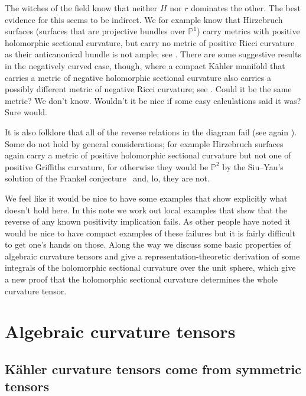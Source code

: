 \documentclass[10pt,a4paper]{amsart}
\theoremstyle{definition}
\newcommand{\kk}[1]{\mathbb{#1}}
\begin{document}
The witches of the field know that neither $H$ nor $r$ dominates the other.
The best evidence for this seems to be indirect.
We for example know that Hirzebruch surfaces (surfaces that are projective
bundles over $\kk P^1$) carry metrics with positive holomorphic sectional
curvature, but carry no metric of positive Ricci curvature as their anticanonical
bundle is not ample;
see \cite{hitchin1975curvature,alvarez2018projectivized,yang2019hirzebruch}.
There are some suggestive results in the negatively curved case, though,
where a compact K\"ahler manifold that carries a metric of negative holomorphic
sectional curvature also carries a possibly different metric of negative Ricci
curvature; see \cite{wu2016negative,tosatti2017extension,diverio2019quasi}.
Could it be the same metric?
We don't know.
Wouldn't it be nice if some easy calculations said it was?
Sure would.

It is also folklore that all of the reverse relations in the diagram fail (see
again \cite{zheng2000complex}). Some do not hold by general considerations; for
example Hirzebruch surfaces
again carry a metric of positive holomorphic sectional curvature but not one of
positive Griffiths curvature, for otherwise they would be $\kk P^2$ by the
Siu--Yau's solution of the Frankel conjecture~\cite{siu1980compact} and, lo,
they are not.

We feel like it would be nice to have some examples that show explicitly what
doesn't hold here.
In this note we work out local examples that show that the reverse of any known
positivity implication fails.
As other people have noted it would be nice to have compact examples of these
failures but it is fairly difficult to get one's hands on those.
Along the way we discuss some basic properties of algebraic curvature tensors
and give a representation-theoretic derivation of some integrals of the
holomorphic sectional curvature over the unit sphere, which give a new proof
that the holomorphic sectional curvature determines the whole curvature tensor.



\section{Algebraic curvature tensors}



\subsection*{K\"ahler curvature tensors come from symmetric tensors}
\end{document}
